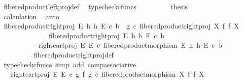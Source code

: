 \begin{isabellebody}
\ fibered{\isacharunderscore}{\kern0pt}product{\isacharunderscore}{\kern0pt}left{\isacharunderscore}{\kern0pt}proj{\isacharunderscore}{\kern0pt}def\ \isamarkupfalse%
\ {\isacharparenleft}{\kern0pt}typecheck{\isacharunderscore}{\kern0pt}cfuncs{\isacharparenright}{\kern0pt}\isanewline
\ \ \ \ \ \ \isamarkupfalse%
\ \isamarkupfalse%
\ {\isacharquery}{\kern0pt}thesis\isanewline
\ \ \ \ \ \ \ \ \isamarkupfalse%
\ calculation\ \isamarkupfalse%
\ auto\isanewline
\ \ \ \ \isamarkupfalse%
\isanewline
\ \ \ \ \isamarkupfalse%
\ {\isachardoublequoteopen}fibered{\isacharunderscore}{\kern0pt}product{\isacharunderscore}{\kern0pt}right{\isacharunderscore}{\kern0pt}proj\ E\ h\ h\ E\ {\isasymcirc}\isactrlsub c\ b\ {\isacharequal}{\kern0pt}\ g\ {\isasymcirc}\isactrlsub c\ fibered{\isacharunderscore}{\kern0pt}product{\isacharunderscore}{\kern0pt}right{\isacharunderscore}{\kern0pt}proj\ X\ f\ f\ X{\isachardoublequoteclose}\isanewline
\ \ \ \ \isamarkupfalse%
\ {\isacharminus}{\kern0pt}\isanewline
\ \ \ \ \ \ \isamarkupfalse%
\ {\isachardoublequoteopen}fibered{\isacharunderscore}{\kern0pt}product{\isacharunderscore}{\kern0pt}right{\isacharunderscore}{\kern0pt}proj\ E\ h\ h\ E\ {\isasymcirc}\isactrlsub c\ b\isanewline
\ \ \ \ \ \ \ \ \ \ {\isacharequal}{\kern0pt}\ right{\isacharunderscore}{\kern0pt}cart{\isacharunderscore}{\kern0pt}proj\ E\ E\ {\isasymcirc}\isactrlsub c\ fibered{\isacharunderscore}{\kern0pt}product{\isacharunderscore}{\kern0pt}morphism\ E\ h\ h\ E\ {\isasymcirc}\isactrlsub c\ b{\isachardoublequoteclose}\isanewline
\ \ \ \ \ \ \ \ \isamarkupfalse%
\ fibered{\isacharunderscore}{\kern0pt}product{\isacharunderscore}{\kern0pt}right{\isacharunderscore}{\kern0pt}proj{\isacharunderscore}{\kern0pt}def\ \isamarkupfalse%
\ {\isacharparenleft}{\kern0pt}typecheck{\isacharunderscore}{\kern0pt}cfuncs{\isacharcomma}{\kern0pt}\ simp\ add{\isacharcolon}{\kern0pt}\ comp{\isacharunderscore}{\kern0pt}associative{}{\isacharparenright}{\kern0pt}\isanewline
\ \ \ \ \ \ \isamarkupfalse%
\ \isamarkupfalse%
\ {\isachardoublequoteopen}{\isachardot}{\kern0pt}{\isachardot}{\kern0pt}{\isachardot}{\kern0pt}\ {\isacharequal}{\kern0pt}\ right{\isacharunderscore}{\kern0pt}cart{\isacharunderscore}{\kern0pt}proj\ E\ E\ {\isasymcirc}\isactrlsub c\ {\isacharparenleft}{\kern0pt}g\ {\isasymtimes}\isactrlsub f\ g{\isacharparenright}{\kern0pt}\ {\isasymcirc}\isactrlsub c\ fibered{\isacharunderscore}{\kern0pt}product{\isacharunderscore}{\kern0pt}morphism\ X\ f\ f\ X{\isachardoublequoteclose}\isanewline

\end{isabellebody}
